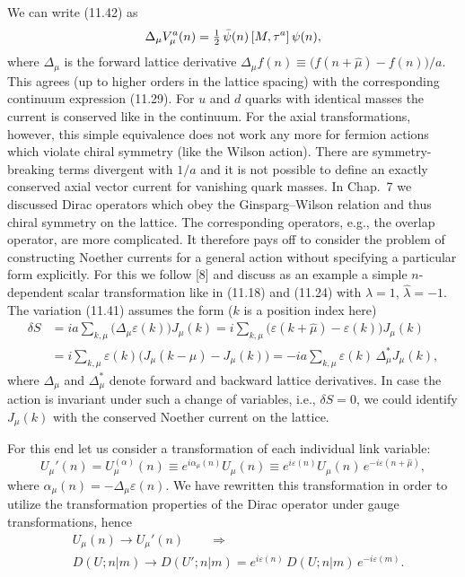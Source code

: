 We can write (11.42) as
\begin{equation}
\Delta_\mu V_\mu^a(n) = \tfrac{1}{2}\,\bar{\psi}(n)\,[M, \tau^a]\,\psi(n) ,
\end{equation}
where $\Delta_\mu$ is the forward lattice derivative $\Delta_\mu f(n) \equiv \bigl(f(n + \hat{\mu}) - f(n)\bigr)/a$.
This agrees (up to higher orders in the lattice spacing) with the corresponding
continuum expression (11.29). For $u$ and $d$ quarks with identical masses the
current is conserved like in the continuum.
For the axial transformations, however, this simple equivalence does not
work any more for fermion actions which violate chiral symmetry (like the
Wilson action). There are symmetry-breaking terms divergent with $1/a$ and it
is not possible to define an exactly conserved axial vector current for vanishing
quark masses.
In Chap.~7 we discussed Dirac operators which obey the Ginsparg--Wilson
relation and thus chiral symmetry on the lattice. The corresponding operators, e.g., the overlap operator, are more complicated. It therefore pays off
to consider the problem of constructing Noether currents for a general action
without specifying a particular form explicitly. For this we follow [8] and discuss as an example a simple $n$-dependent scalar transformation like in (11.18)
and (11.24) with $\lambda = 1$, $\hat{\lambda} = -1$.
The variation (11.41) assumes the form ($k$ is a position index here)
\begin{equation}
\begin{aligned}
\delta S &= i a \sum_{k,\mu} \bigl(\Delta_\mu\varepsilon(k)\bigr) J_\mu(k)
= i \sum_{k,\mu} \bigl(\varepsilon(k + \hat{\mu}) - \varepsilon(k)\bigr) J_\mu(k) \\
&= i \sum_{k,\mu} \varepsilon(k) \bigl(J_\mu(k - \hat{\mu}) - J_\mu(k)\bigr)
= -i a \sum_{k,\mu} \varepsilon(k)\, \Delta_\mu^* J_\mu(k) ,
\end{aligned}
\end{equation}
where $\Delta_\mu$ and $\Delta_\mu^*$ denote forward and backward lattice derivatives. In case
the action is invariant under such a change of variables, i.e., $\delta S = 0$, we could
identify $J_\mu(k)$ with the conserved Noether current on the lattice.

For this end let us consider a transformation of each individual link
variable:
\begin{equation}
U_\mu'(n) = U_\mu^{(\alpha)}(n) \equiv e^{i\alpha_\mu(n)} U_\mu(n)
\equiv e^{i\varepsilon(n)} U_\mu(n)\, e^{-i\varepsilon(n + \hat{\mu})} ,
\end{equation}
where $\alpha_\mu(n) = -\Delta_\mu\varepsilon(n)$. We have rewritten this transformation in order
to utilize the transformation properties of the Dirac operator under gauge
transformations, hence
\begin{equation}
\begin{aligned}
&U_\mu(n) \to U_\mu'(n) \qquad\Rightarrow\qquad\\
&D(U; n|m) \to D(U'; n|m) = e^{i\varepsilon(n)}\, D(U; n|m)\, e^{-i\varepsilon(m)} .
\end{aligned}
\end{equation}

